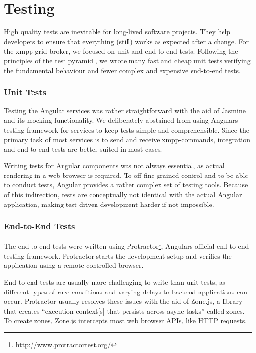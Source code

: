 \section{Testing}\label{sec:testing}

High quality tests are inevitable for long-lived software projects.
They help developers to ensure that everything (still) works as expected after a change.
For the \gls{xmpp-grid-broker}, we focused on unit and end-to-end tests.
Following the principles of the test pyramid \cite{Cohn:2009:SAS:1667109}, we wrote many fast and cheap unit tests verifying the fundamental behaviour and fewer complex and expensive end-to-end tests.

\subsubsection{Unit Tests}

Testing the Angular services was rather straightforward with the aid of Jasmine and its mocking functionality.
We deliberately abstained from using Angulars testing framework for services to keep tests simple and comprehensible.
Since the primary task of most services is to send and receive \gls{xmpp}-commands, integration and end-to-end tests are better suited in most cases.

Writing tests for Angular components was not always essential, as actual rendering in a web browser is required.
To off fine-grained control and to be able to conduct tests, Angular provides a rather complex set of testing tools.
Because of this indirection, tests are conceptually not identical with the actual Angular application, making test driven development harder if not impossible.

\subsubsection{End-to-End Tests}

The end-to-end tests were written using Protractor\footnote{\url{http://www.protractortest.org/}}, Angulars official end-to-end testing framework.
Protractor starts the development setup and verifies the application using a remote-controlled browser.

End-to-end tests are usually more challenging to write than unit tests, as different types of race conditions and varying delays to backend applications can occur.
Protractor usually resolves these issues with the aid of Zone.js, a library that creates ``execution context[s] that persists across async tasks'' called zones.
To create zones, Zone.js intercepts most web browser APIs, like HTTP requests.~\cite{zone-js-readme}

